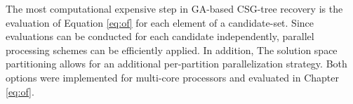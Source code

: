 The most computational expensive step in \ac{GA}-based \ac{CSG}-tree recovery is the evaluation of Equation \ref{eq:of} for each element of a candidate-set. 
Since evaluations can be conducted for each candidate independently, parallel processing schemes can be efficiently applied.  
In addition, The solution space partitioning allows for an additional per-partition parallelization strategy.
Both options were implemented for multi-core processors and evaluated in Chapter \ref{eq:of}.
